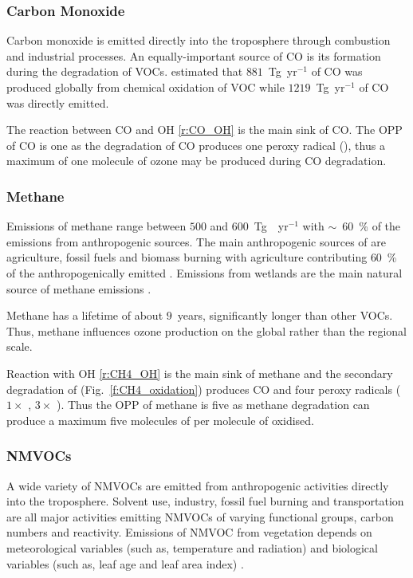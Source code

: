 \subsubsection{Carbon Monoxide}
Carbon monoxide is emitted directly into the troposphere through combustion and industrial processes.
An equally-important source of CO is its formation during the degradation of VOCs.
\citet{Hauglustaine:1998} estimated that $881$~Tg~yr$^{-1}$ of CO was produced globally from chemical oxidation of VOC while $1219$~Tg~yr$^{-1}$ of CO was directly emitted.

The reaction between CO and OH \eqref{r:CO_OH} is the main sink of CO.
The OPP of CO is one as the degradation of CO produces one peroxy radical (), thus a maximum of one molecule of ozone may be produced during CO degradation.

\subsubsection{Methane}
Emissions of methane range between $500$ and $600$~Tg~~yr$^{-1}$ with $\sim$~$60$~\% of the emissions from anthropogenic sources.
The main anthropogenic sources of  are agriculture, fossil fuels and biomass burning with agriculture contributing $60$~\% of the anthropogenically emitted .
Emissions from wetlands are the main natural source of methane emissions \citep{Kirschke:2013}.

Methane has a lifetime of about $9$~years, significantly longer than other VOCs.
Thus, methane influences ozone production on the global rather than the regional scale.  

Reaction with OH \eqref{r:CH4_OH} is the main sink of methane and the secondary degradation of  (Fig.~\ref{f:CH4_oxidation}) produces CO and four peroxy radicals ($1 \times$ , $3 \times$ ).
Thus the OPP of methane is five as methane degradation can produce a maximum five molecules of  per molecule of  oxidised. 

\subsubsection{NMVOCs}
A wide variety of NMVOCs are emitted from anthropogenic activities directly into the troposphere.
Solvent use, industry, fossil fuel burning and transportation are all major activities emitting NMVOCs of varying functional groups, carbon numbers and reactivity.
Emissions of NMVOC from vegetation depends on meteorological variables (such as, temperature and radiation) and biological variables (such as, leaf age and leaf area index) \citep{Guenther:2012}.

